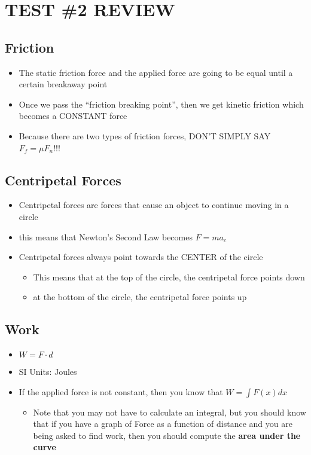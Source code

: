 \chapter{TEST \#2 REVIEW}

\section{Friction}

\begin{itemize}
    \item The static friction force and the applied force are going to be equal until a certain breakaway point
    \item Once we pass the “friction breaking point”, then we get kinetic friction which becomes a CONSTANT force
    \item Because there are two types of friction forces, DON’T SIMPLY SAY $F_f = \mu F_n$!!!
\end{itemize}


\section{Centripetal Forces}

\begin{itemize}
    \item Centripetal forces are forces that cause an object to continue moving in a circle
    \item this means that Newton’s Second Law becomes $F=ma_c$
    \item Centripetal forces always point towards the CENTER of the circle
    \begin{itemize}
        \item This means that at the top of the circle, the centripetal force points down
        \item at the bottom of the circle, the centripetal force points up
    \end{itemize}
\end{itemize}


\section{Work}

\begin{itemize}
    \item $W = F \cdot d$
    \item SI Units: Joules
    \item If the applied force is not constant, then you know that $W = \int F(x)dx$
    \begin{itemize}
        \item Note that you may not have to calculate an integral, but you should know that if you have a graph of Force as a function of distance and you are being asked to find work, then you should compute the \textbf{area under the curve}
    \end{itemize}
\end{itemize}


